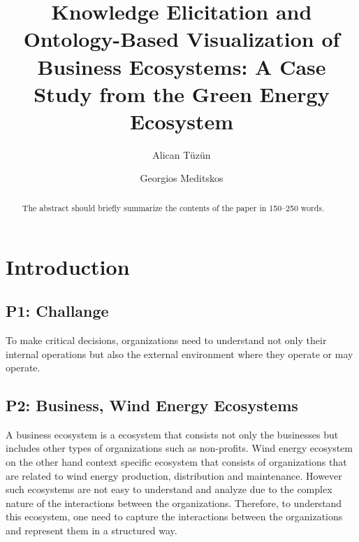 \documentclass[runningheads]{llncs}
\begin{document}
%
\title{Knowledge Elicitation and Ontology-Based Visualization of Business Ecosystems: A Case Study from the 
Green Energy Ecosystem}
%
%
\author{Alican Tüzün \and
Georgios Meditskos
}
%
%
%
\maketitle              %
%
\begin{abstract}
The abstract should briefly summarize the contents of the paper in
150--250 words.

\end{abstract}
%
%
%
\section{Introduction}

\subsection{P1: Challange}
To make critical decisions, organizations need to understand not only their internal operations but also the external environment where 
they operate or may operate. 


\subsection{P2: Business, Wind Energy Ecosystems}
A business ecosystem is a ecosystem that consists not only the businesses but includes other types of organizations
such as non-profits. Wind energy ecosystem on the other hand context specific ecosystem that consists of
organizations that are related to wind energy production, distribution and maintenance. However such ecosystems 
are not easy to understand and analyze due to the complex nature of the interactions between the organizations. Therefore,
to understand this ecosystem, one need to capture the interactions between the organizations and represent them
in a structured way.
\end{document}
